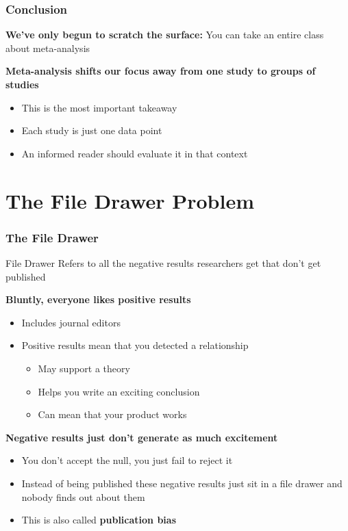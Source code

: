 \documentclass[10pt, block=fill]{beamer}
\begin{document}
\begin{frame}
    \frametitle{Conclusion}
    
    \textbf{We've only begun to scratch the surface:} You can take an entire class about meta-analysis
    
    \vspace{0.25in}
    
    \textbf{Meta-analysis shifts our focus away from one study to groups of studies}
    \begin{itemize}
        \item This is the most important takeaway
        \item Each study is just one data point
        \item An informed reader should evaluate it in that context
    \end{itemize}
\end{frame}



\section{The File Drawer Problem}

\begin{frame}
    \frametitle{The File Drawer}
    
    \begin{block}{File Drawer}
        Refers to all the negative results researchers get that don't get published
    \end{block}
    
    \textbf{Bluntly, everyone likes positive results}
    \begin{itemize}
        \item Includes journal editors
        \item Positive results mean that you detected a relationship
        \begin{itemize}
            \item May support a theory
            \item Helps you write an exciting conclusion
            \item Can mean that your product works
        \end{itemize}
    \end{itemize}
    
    \textbf{Negative results just don't generate as much excitement}
    \begin{itemize}
        \item You don't accept the null, you just fail to reject it
        \item Instead of being published these negative results just sit in a file drawer and nobody finds out about them
        \item This is also called \textbf{publication bias}
    \end{itemize}
\end{frame}
\end{document}
